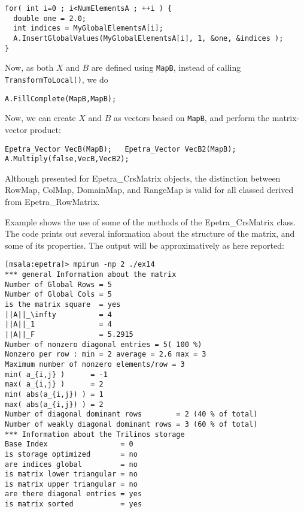 \begin{verbatim}
for( int i=0 ; i<NumElementsA ; ++i ) {
  double one = 2.0;
  int indices = MyGlobalElementsA[i];
  A.InsertGlobalValues(MyGlobalElementsA[i], 1, &one, &indices );
}
\end{verbatim}
Now, as both $X$ and $B$ are defined using \verb!MapB!, instead of
calling \verb!TransformToLocal()!, we do
\begin{verbatim}
A.FillComplete(MapB,MapB);
\end{verbatim}
Now, we can create $X$ and $B$ as vectors based on \verb!MapB!, and
perform the matrix-vector product:
\begin{verbatim}
Epetra_Vector VecB(MapB);   Epetra_Vector VecB2(MapB);  
A.Multiply(false,VecB,VecB2);
\end{verbatim}  

\begin{remark}
Although presented for Epetra\_CrsMatrix objects, the distinction
between RowMap, ColMap, DomainMap, and RangeMap is valid for all classed
derived from Epetra\_RowMatrix. 
\end{remark}


\medskip

Example  shows the use of some of the methods of 
the Epetra\_CrsMatrix class. The code prints out several information
about the structure of the matrix, and some of its properties.
The output will be approximatively as here reported:
\begin{verbatim}
[msala:epetra]> mpirun -np 2 ./ex14
*** general Information about the matrix
Number of Global Rows = 5
Number of Global Cols = 5
is the matrix square  = yes
||A||_\infty          = 4
||A||_1               = 4
||A||_F               = 5.2915
Number of nonzero diagonal entries = 5( 100 %)
Nonzero per row : min = 2 average = 2.6 max = 3
Maximum number of nonzero elements/row = 3
min( a_{i,j} )      = -1
max( a_{i,j} )      = 2
min( abs(a_{i,j}) ) = 1
max( abs(a_{i,j}) ) = 2
Number of diagonal dominant rows        = 2 (40 % of total)
Number of weakly diagonal dominant rows = 3 (60 % of total)
*** Information about the Trilinos storage
Base Index                 = 0
is storage optimized       = no
are indices global         = no
is matrix lower triangular = no
is matrix upper triangular = no
are there diagonal entries = yes
is matrix sorted           = yes
\end{verbatim}

